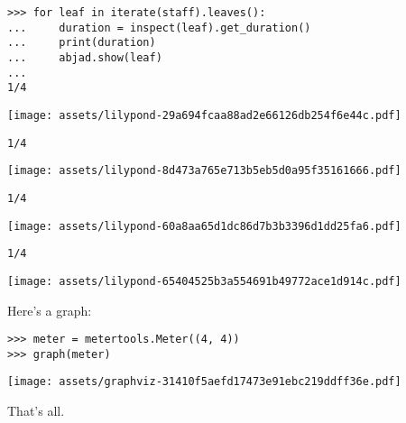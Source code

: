 \documentclass{article}
\begin{document}
\begin{lstlisting}
>>> for leaf in iterate(staff).leaves():
...     duration = inspect(leaf).get_duration()
...     print(duration)
...     abjad.show(leaf)
...
1/4
\end{lstlisting}
\noindent\texttt{[image: assets/lilypond-29a694fcaa88ad2e66126db254f6e44c.pdf]}
\begin{lstlisting}
1/4
\end{lstlisting}
\noindent\texttt{[image: assets/lilypond-8d473a765e713b5eb5d0a95f35161666.pdf]}
\begin{lstlisting}
1/4
\end{lstlisting}
\noindent\texttt{[image: assets/lilypond-60a8aa65d1dc86d7b3b3396d1dd25fa6.pdf]}
\begin{lstlisting}
1/4
\end{lstlisting}
\noindent\texttt{[image: assets/lilypond-65404525b3a554691b49772ace1d914c.pdf]}

Here's a graph:

\begin{comment}
<abjad>
meter = metertools.Meter((4, 4))
graph(meter)
</abjad>
\end{comment}

\begin{lstlisting}
>>> meter = metertools.Meter((4, 4))
>>> graph(meter)
\end{lstlisting}
\noindent\texttt{[image: assets/graphviz-31410f5aefd17473e91ebc219ddff36e.pdf]}

That's all.
\end{document}
